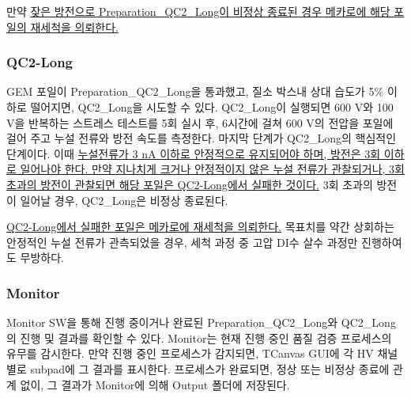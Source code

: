 만약 \uline{잦은 방전으로 Preparation\_QC2\_Long이 비정상 종료된 경우 메카로에 해당 포일의 재세척을 의뢰한다.}

\subsubsection{QC2-Long}
GEM 포일이 Preparation\_QC2\_Long을 통과했고, 질소 박스내 상대 습도가 5\% 이하로 떨어지면, QC2\_Long을 시도할 수 있다. QC2\_Long이 실행되면 600 V와 100 V을 반복하는 스트레스 테스트를 5회 실시 후, 6시간에 걸쳐 600 V의 전압을 포일에 걸어 주고 누설 전류와 방전 속도를 측정한다. 마지막 단계가 QC2\_Long의 핵심적인 단계이다. 이때 \uline{누설전류가 3 nA 이하로 안정적으로 유지되어야 하며, 방전은 3회 이하로 일어나야 한다. 만약 지나치게 크거나 안정적이지 않은 누설 전류가 관찰되거나, 3회 초과의 방전이 관찰되면 해당 포일은 QC2-Long에서 실패한 것이다.} 3회 초과의 방전이 일어날 경우, QC2\_Long은 비정상 종료된다.

\uline{QC2-Long에서 실패한 포일은 메카로에 재세척을 의뢰한다.} 목표치를 약간 상회하는 안정적인 누설 전류가 관측되었을 경우, 세척 과정 중 고압 DI수 살수 과정만 진행하여도 무방하다.

\subsubsection{Monitor}
Monitor SW을 통해 진행 중이거나 완료된 Preparation\_QC2\_Long와 QC2\_Long의 진행 및 결과를 확인할 수 있다. Monitor는 현재 진행 중인 품질 검증 프로세스의 유무를 감시한다. 만약 진행 중인 프로세스가 감지되면, TCanvas GUI에 각 HV 채널 별로 subpad에 그 결과를 표시한다. 프로세스가 완료되면, 정상 또는 비정상 종료에 관계 없이, 그 결과가 Monitor에 의해 Output 폴더에 저장된다.
